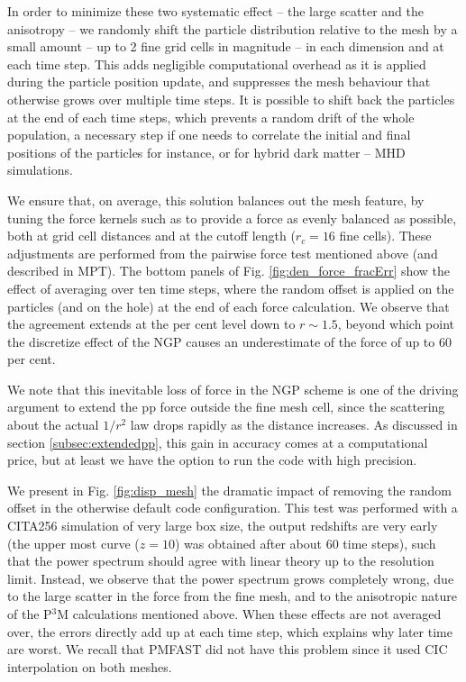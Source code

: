 In order to minimize these two systematic effect -- the large scatter and the anisotropy -- 
we randomly shift the particle distribution relative to the mesh by a small
amount -- up to 2 fine grid cells in magnitude -- in each
dimension and at each time step.  This adds negligible computational
overhead as it is applied during the particle position update,
and suppresses the mesh behaviour that otherwise grows over multiple time steps.
It is possible to shift back the particles at the end of each time steps,
which prevents a random drift of the whole population, a necessary step 
if one needs to correlate the initial and final positions of the particles for instance,
or for hybrid dark matter -- MHD simulations.
 
We ensure that, on average, this solution balances out the mesh feature,
by tuning the force kernels such as to provide a force as evenly balanced as possible, both at grid cell distances
and at the cutoff length ($r_{c}=16$ fine cells).
These adjustments are performed from the pairwise force test mentioned above (and described in MPT).
The bottom panels of Fig. \ref{fig:den_force_fracErr} show the effect of averaging over ten time steps, 
where the random offset is applied on the particles (and on the hole) at the end of each force calculation. 
We observe that the agreement extends at the per cent level down to $r \sim 1.5$, beyond which point
the discretize effect of the NGP causes an underestimate of the force of up to 60 per cent.

We note that this inevitable loss of force in the NGP scheme is one of the driving argument to extend the pp force outside the fine mesh cell,
since the scattering about the actual $1/r^{2}$ law drops rapidly as the distance increases.
As discussed in section \ref{subsec:extendedpp}, this gain in accuracy comes at a computational price,
but at least we have the option to run the code with high precision.

We present in Fig. \ref{fig:disp_mesh} the dramatic impact of removing the random offset in the otherwise default code configuration.
This test was performed with a CITA256 simulation of very large box size,
the output redshifts are very early (the upper most curve ($z=10$) was obtained after
about 60 time steps), such that the power spectrum should agree with linear theory up to the resolution limit.
Instead, we observe that the power spectrum grows completely wrong, due to the large scatter in the force from the fine mesh,
and to the anisotropic nature of the P$^3$M calculations mentioned above.
When these effects are not averaged over, the errors directly add up at each time step,
which explains why later time are worst.
We recall that {\small PMFAST} did not have this problem since it used CIC interpolation on both meshes.  

